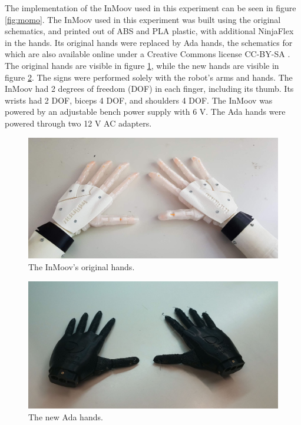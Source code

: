 The implementation of the InMoov used in this experiment can be seen in figure \ref{fig:momo}. The InMoov used in this experiment was built using the original schematics, and printed out of ABS and PLA plastic, with additional NinjaFlex in the hands. Its original hands were replaced by Ada hands, the schematics for which are also available online under a Creative Commons license CC-BY-SA \cite{adaOpenbionics}. The original hands are visible in figure \ref{fig:inmoovhands}, while the new hands are visible in figure \ref{fig:adahands}. The signs were performed solely with the robot's arms and hands. The InMoov had 2 degrees of freedom (DOF) in each finger, including its thumb. Its wrists had 2 DOF, biceps 4 DOF, and shoulders 4 DOF. The InMoov was powered by an adjustable bench power supply with 6 V. The Ada hands were powered through two 12 V AC adapters.

\begin{figure}
\centering
  \includegraphics[width=\linewidth]{images/Inmoov-hands.jpg}
  \caption{The InMoov's original hands.}
  \label{fig:inmoovhands}
\end{figure}

\begin{figure}
\centering
  \includegraphics[width=\linewidth]{images/Ada-hands.jpeg}
  \caption{The new Ada hands.}
  \label{fig:adahands}
\end{figure}

